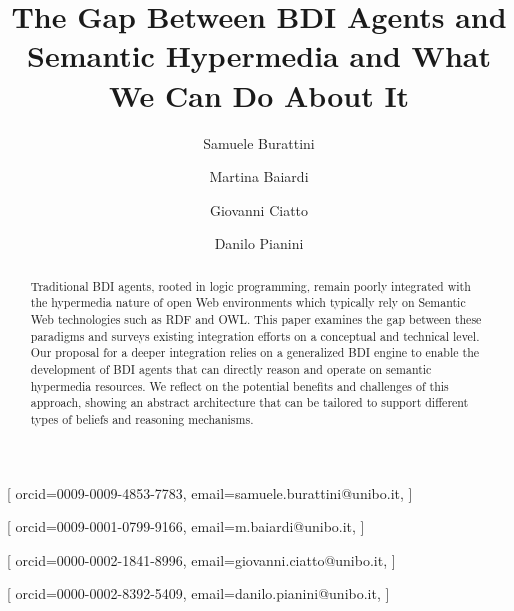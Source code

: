 \documentclass[
]{ceurart}
\begin{document}


\title{The Gap Between BDI Agents and Semantic Hypermedia and What We Can Do About It}


\author[1]{Samuele Burattini}[%
orcid=0009-0009-4853-7783,
email=samuele.burattini@unibo.it,
]
\cormark[1]
\fnmark[1]

\author[1]{Martina Baiardi}[%
orcid=0009-0001-0799-9166,
email=m.baiardi@unibo.it,
]
\fnmark[1]

\author[1]{Giovanni Ciatto}[%
orcid=0000-0002-1841-8996,
email=giovanni.ciatto@unibo.it,
]


\author[1]{Danilo Pianini}[%
orcid=0000-0002-8392-5409,
email=danilo.pianini@unibo.it,
]



\address[1]{\disi, \unibo}



\begin{abstract}
  Traditional BDI agents,
  rooted in logic programming,
  remain poorly integrated with the hypermedia nature of open Web environments
  which typically rely on Semantic Web technologies such as RDF and OWL.
  This paper examines the gap between these paradigms and surveys existing integration efforts on a conceptual and technical level.
  Our proposal for a deeper integration relies on a generalized BDI engine to enable the development of BDI agents that can directly reason and operate on semantic hypermedia resources.
  We reflect on the potential benefits and challenges of this approach, showing an abstract architecture that can be tailored to support different types of beliefs and reasoning mechanisms.
\end{abstract}
\end{document}
